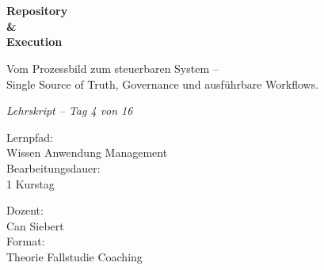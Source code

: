 \documentclass[11pt,a4paper,oneside]{article}
\newcommand{\caveatfontfallback}{\itshape}
\newcommand\caveatfont{\caveatfontfallback}%
\begin{document}
\begin{titlepage}
  \pagestyle{empty}
  \vspace*{1.5cm}
  \\[2pt]
  \noindent{\color{lpAccent}\rule{\linewidth}{1.2pt}}\\[4pt]

  \vspace{3cm}
  {\sffamily\fontsize{30}{34}\selectfont\bfseries\color{lpInk}Repository\\\&\\Execution\par}

  \vspace{0.7cm}
  {\sffamily\large\color{lpGray}Vom Prozessbild zum steuerbaren System --\\Single Source of Truth, Governance und ausführbare Workflows.\par}

  \vspace{1.5cm}
  {\caveatfont\LARGE\color{lpAmber}Lehrskript -- Tag 4 von 16}\par

  \vfill

  \noindent\begin{minipage}{0.55\linewidth}
    {\sffamily\footnotesize\color{lpGray}Lernpfad:}\\
    {\sffamily\small\color{lpInk}Wissen \textrightarrow{} Anwendung \textrightarrow{} Management}\\[10pt]
    {\sffamily\footnotesize\color{lpGray}Bearbeitungsdauer:}\\
    {\sffamily\small\color{lpInk}1 Kurstag}
  \end{minipage}\hfill
  \begin{minipage}{0.4\linewidth}
    \raggedleft
    {\sffamily\footnotesize\color{lpGray}Dozent:}\\
    {\sffamily\small\color{lpInk}Can Siebert}\\[10pt]
    {\sffamily\footnotesize\color{lpGray}Format:}\\
    {\sffamily\small\color{lpInk}Theorie \textperiodcentered{} Fallstudie \textperiodcentered{} Coaching}
  \end{minipage}

  \vspace{0.5cm}
  \noindent{\color{lpAccent}\rule{\linewidth}{0.6pt}}
\end{titlepage}
\end{document}
